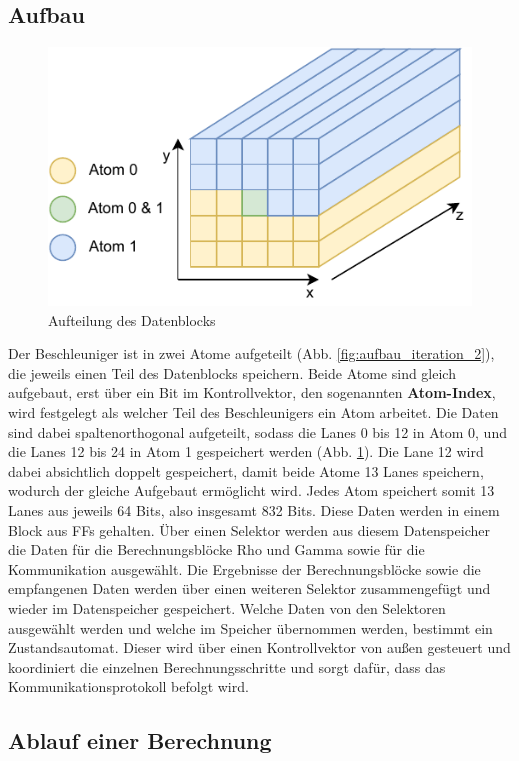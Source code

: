 \subsection{Aufbau}
\begin{figure}
	\center
	\includegraphics{images/Datenaufteilung_Iteration_2.pdf}
	\caption{Aufteilung des Datenblocks}
	\label{fig:datenaufteilung}
\end{figure}
Der Beschleuniger ist in zwei Atome aufgeteilt (Abb. \ref{fig:aufbau_iteration_2}), die jeweils einen Teil des Datenblocks speichern. Beide Atome sind gleich aufgebaut, erst über ein Bit im Kontrollvektor,
den sogenannten \textbf{Atom-Index}, wird festgelegt als welcher Teil des Beschleunigers ein Atom arbeitet. Die Daten sind dabei spaltenorthogonal aufgeteilt, sodass die Lanes 0 bis 12 in Atom 0,
und die Lanes 12 bis 24 in Atom 1 gespeichert werden (Abb. \ref{fig:datenaufteilung}). Die Lane 12 wird dabei absichtlich doppelt gespeichert,
damit beide Atome 13 Lanes speichern, wodurch der gleiche Aufgebaut ermöglicht wird. Jedes Atom speichert somit 13 Lanes aus jeweils 64 Bits, also insgesamt 832 Bits.
Diese Daten werden in einem Block aus FFs gehalten. Über einen Selektor werden aus diesem Datenspeicher die Daten für die Berechnungsblöcke Rho und Gamma sowie für die Kommunikation ausgewählt.
Die Ergebnisse der Berechnungsblöcke sowie die empfangenen Daten werden über einen weiteren Selektor zusammengefügt und wieder im Datenspeicher gespeichert.
Welche Daten von den Selektoren ausgewählt werden und welche im Speicher übernommen werden, bestimmt ein Zustandsautomat. Dieser wird über einen Kontrollvektor von außen gesteuert
und koordiniert die einzelnen Berechnungsschritte und sorgt dafür, dass das Kommunikationsprotokoll befolgt wird.

\subsection{Ablauf einer Berechnung}
